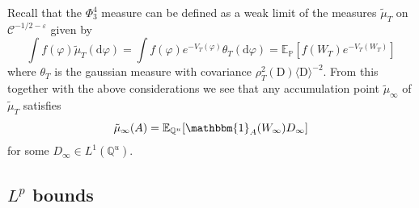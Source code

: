 \documentclass[11pt]{article}
\newcommand{\mathD}{\mathrm{D}}
\newcommand{\mathd}{\mathrm{d}}
\newcommand{\VV}{\mathscr{C}}
\begin{document}
Recall that the $\Phi_3^4$ measure can be defined as a weak limit of the
measures $\tilde{\mu}_T$ on $\VV^{- 1 / 2 - \varepsilon}$ given by
\[ \int f (\varphi) \tilde{\mu}_T (\mathd \varphi) = \int f (\varphi) e^{-
   V_T (\varphi)} \theta_T (\mathd \varphi) =\mathbb{E}_{\mathbb{P}} [f (W_T)
   e^{- V_T (W_T)}] \]
where $\theta_T$ is the gaussian measure with covariance $\rho^2_T (\mathD)
\langle \mathD \rangle^{- 2}$. From this together with the above
considerations we see that any accumulation point $\tilde{\mu}_{\infty}$ of
$\tilde{\mu}_T$ satisfies
\begin{equation}
  \tilde{\mu}_{\infty} (A) =\mathbb{E}_{\mathbb{Q}^u} [\mathbbm{1}_A
  (W_{\infty}) D_{\infty}] \label{eq:Phi4def}
\end{equation}
for some $D_{\infty} \in L^1 (\mathbb{Q}^u)$.

\subsection[Lp bounds]{$L^p$ bounds}\label{sec:lp-bounds}
\end{document}

